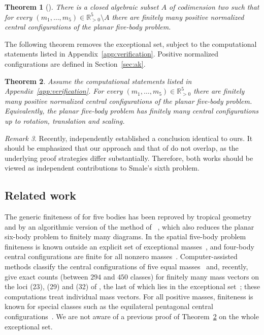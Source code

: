 \documentclass[11pt]{amsart}
\newtheorem{theorem}{Theorem}[section]
\theoremstyle{definition}
\theoremstyle{remark}
\newtheorem{remark}[theorem]{Remark}
\newcommand{\Rp}{\mathbb{R}_{>0}}
\begin{document}
\begin{theorem}[{\cite[Thm.~2]{AK}}]
There is a closed algebraic subset $A$ of codimension two such that for every
$(m_1,\dots,m_5)\in\Rp^5\setminus A$ there are finitely many positive normalized central
configurations of the planar five-body problem.
\end{theorem}
The following theorem removes the exceptional set, subject to the computational
statements listed in Appendix~\ref{app:verification}.  Positive normalized configurations
are defined in Section~\ref{sec:ak}.

\begin{theorem}\label{thm:main}
Assume the computational statements listed in Appendix~\ref{app:verification}.
For every $(m_1,\dots,m_5)\in\Rp^5$ there are finitely many positive normalized central
configurations of the planar five-body problem.  Equivalently, the planar five-body problem
has finitely many central configurations up to rotation, translation and scaling.
\end{theorem}
\begin{remark}
Recently, \cite{FiveT} independently established a conclusion identical to ours. It should be emphasized that our approach and that of \cite{FiveT} do not overlap, as the underlying proof strategies differ substantially. Therefore, both works should be viewed as independent contributions to Smale's sixth problem.
\end{remark}
\subsection*{Related work}
The generic finiteness of \cite{AK} for five bodies has been reproved by tropical
geometry~\cite{JL} and by an algorithmic version of the method of \cite{AK}~\cite{CC1,CC2},
which also reduces the planar six-body problem to finitely many diagrams.  In the spatial
five-body problem finiteness is known outside an explicit set of exceptional
masses~\cite{HJ}, and four-body central configurations are finite for all nonzero
masses~\cite{YZ}.  Computer-assisted methods classify the central configurations of five equal
masses~\cite{LS,MZ19} and, recently, give exact counts (between $294$ and $450$ classes) for
finitely many mass vectors on the loci (23), (29) and (32) of \cite[\S8]{AK}, the last of which
lies in the exceptional set~\cite{MZ26}; these computations treat individual mass vectors.
For all positive masses, finiteness is known for special classes such as the equilateral
pentagonal central configurations~\cite{DH}.  We are not aware of a previous proof of
Theorem~\ref{thm:main} on the whole exceptional set.
\end{document}
